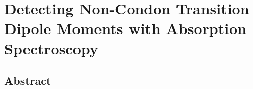 \chapter{Detecting Non-Condon Transition Dipole Moments with Absorption Spectroscopy}
\thispagestyle{plain}
\vspace{-.5cm}


\section*{Abstract}
    \dsp
    



